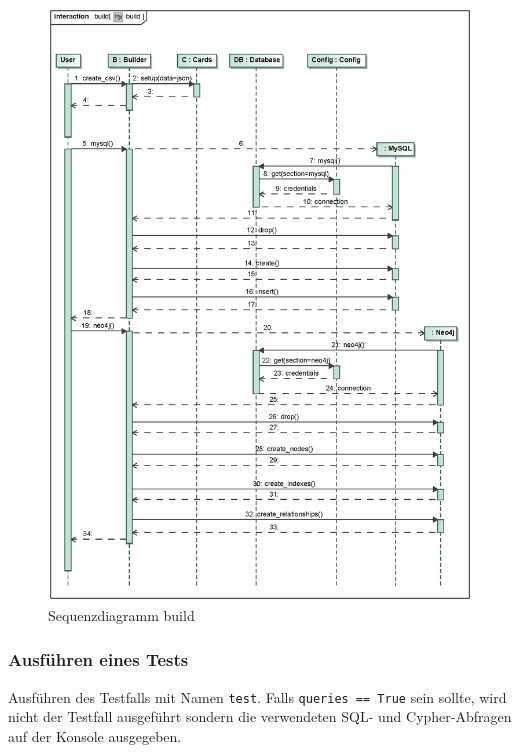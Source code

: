 \begin{figure}[H]
    \myfloatalign
    \includegraphics[width=1.1\textwidth]{gfx/MtGDeepAnalysis/cli_build.eps}
    \caption{Sequenzdiagramm build} %
    \label{fig:seq:build}
\end{figure}

\subsubsection{Ausführen eines Tests}
Ausführen des Testfalls mit Namen \verb|test|. Falls \verb|queries == True| sein sollte, wird nicht der Testfall ausgeführt sondern die verwendeten SQL- und Cypher-Abfragen auf der Konsole ausgegeben.

